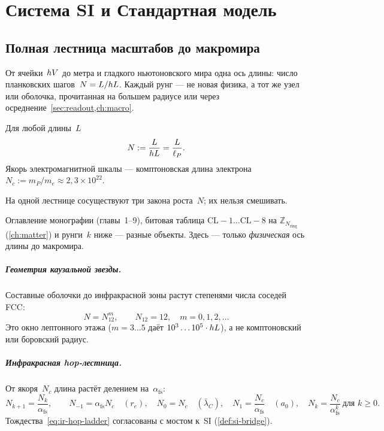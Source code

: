 \chapter{Система SI и Стандартная модель}
\label{ch:si-sm}

\section{Полная лестница масштабов до макромира}
\label{sec:full-ladder}

От ячейки~$hV$ до метра и гладкого ньютоновского мира одна ось длины:
число планковских шагов~$N=L/hL$.
Каждый рунг --- не новая физика, а тот же узел или оболочка,
прочитанная на большем радиусе или через осреднение~\cref{sec:readout,ch:macro}.

\begin{definition}
\label{def:hop-count}
Для любой длины~$L$
\[
  N:=\frac{L}{hL}=\frac{L}{\ell_P}.
\]
Якорь электромагнитной шкалы --- комптоновская длина электрона
$N_c:=m_P/m_e\approx 2{,}3\times 10^{22}$.
\end{definition}

На одной лестнице сосуществуют три закона роста~$N$; их нельзя смешивать.

\begin{remark}
Оглавление монографии (главы~1--9), битовая таблица $\mathrm{CL}{-}1\ldots\mathrm{CL}{-}8$
на $\mathbb{Z}_{N_{\mathrm{ring}}}$ (\cref{ch:matter}) и рунги~$k$ ниже ---
разные объекты.
Здесь --- только \emph{физическая} ось длины до макромира.
\end{remark}

\paragraph{Геометрия каузальной звезды.}
Составные оболочки до инфракрасной зоны растут степенями числа соседей FCC:
\[
  N=N_{12}^{m},\qquad N_{12}=12,\quad m=0,1,2,\ldots
\]
Это окно лептонного этажа ($m=3\ldots 5$ даёт $10^3\ldots 10^5\cdot hL$),
а не комптоновский или боровский радиус.

\paragraph{Инфракрасная hop-лестница.}
От якоря~$N_c$ длина растёт делением на~$\alpha_{\mathrm{fs}}$:
\begin{equation}
\label{eq:ir-hop-ladder}
  N_{k+1}=\frac{N_k}{\alpha_{\mathrm{fs}}},\qquad
  N_{-1}=\alpha_{\mathrm{fs}} N_c\quad(r_e),\quad
  N_0=N_c\quad(\bar\lambda_C),\quad
  N_1=\frac{N_c}{\alpha_{\mathrm{fs}}}\quad(a_0),\quad
  N_k=\frac{N_c}{\alpha_{\mathrm{fs}}^{k}}\ \text{для }k\geq 0.
\end{equation}
Тождества~\eqref{eq:ir-hop-ladder} согласованы с мостом к~SI (\cref{def:si-bridge}).

